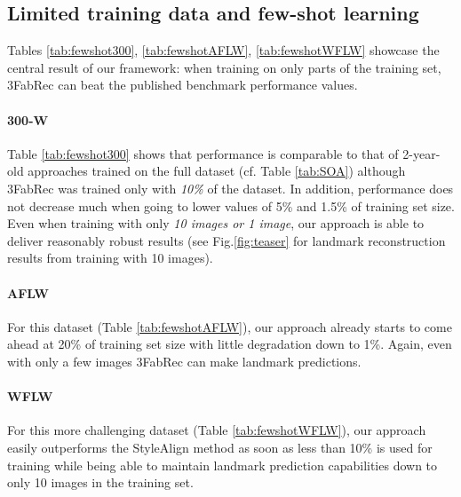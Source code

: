 \documentclass[10pt,twocolumn,letterpaper]{article}
\begin{document}
\subsection{Limited training data and few-shot learning }
Tables \ref{tab:fewshot300}, \ref{tab:fewshotAFLW}, \ref{tab:fewshotWFLW} showcase the central result of our framework: when training on only parts of the training set, 3FabRec can beat the published benchmark performance values. 

\vspace{-0.3cm}\paragraph{300-W} Table \ref{tab:fewshot300} shows that performance is comparable to that of 2-year-old approaches trained on the full dataset (cf. Table \ref{tab:SOA}) although 3FabRec was trained only with {\em 10\%} of the dataset. In addition, performance does not decrease much when going to lower values of 5\% and 1.5\% of training set size. Even when training with only {\em 10 images or 1 image}, our approach is able to deliver reasonably robust results (see Fig.\ref{fig:teaser} for landmark reconstruction results from training with 10 images). 

\vspace{-0.3cm}\paragraph{AFLW} For this dataset (Table \ref{tab:fewshotAFLW}), our approach already starts to come ahead at 20\% of training set size with little degradation down to 1\%. Again, even with only a few images 3FabRec can make landmark predictions. 

\vspace{-0.3cm}\paragraph{WFLW} For this more challenging dataset (Table \ref{tab:fewshotWFLW}), our approach easily outperforms the StyleAlign \cite{Honari2018} method as soon as less than 10\% is used for training while being able to maintain landmark prediction capabilities down to only 10 images in the training set.
\end{document}
